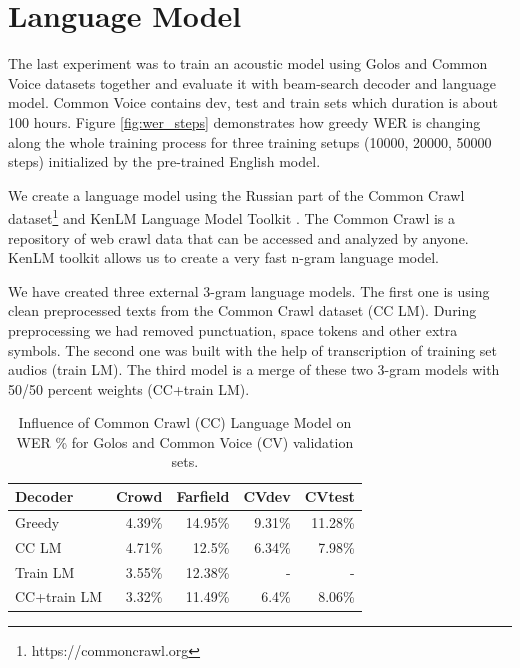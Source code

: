 \documentclass[a4paper]{article}
\begin{document}
\section{Language Model}

The last experiment was to train an acoustic model using Golos and Common Voice \cite{ardila2019common} datasets together and evaluate it with beam-search decoder and language model. Common Voice contains dev, test and train sets which duration is about 100 hours. Figure \ref{fig:wer_steps} demonstrates how greedy WER is changing along the whole training process for three training setups (10000, 20000, 50000 steps) initialized by the pre-trained English model.

We create a language model using the Russian part of the Common Crawl dataset\footnote{https://commoncrawl.org} and KenLM Language Model Toolkit \cite{heafield-2011-kenlm}. The Common Crawl is a repository of web crawl data that can be accessed and analyzed by anyone. KenLM toolkit allows us to create a very fast n-gram language model.

We have created three external 3-gram language models. The first one is using clean preprocessed texts from the Common Crawl dataset (CC LM). During preprocessing we had removed punctuation, space tokens and other extra symbols. The second one was built with the help of transcription of training set audios (train LM). The third model is a merge of these two 3-gram models with 50/50 percent weights (CC+train LM).


\begin{table}[t]
  \caption{Influence of Common Crawl (CC) Language Model on WER \% for Golos and Common Voice (CV) validation sets.}
  \label{tab:language_model}
  \centering
  \begin{tabular}{lrrrr}
    \toprule
    \textbf{Decoder} & \textbf{Crowd} & \textbf{Farfield} & CVdev & CVtest \\
    
    \midrule
    Greedy & 4.39\% & 14.95\% & 9.31\% & 11.28\% \\
    CC LM & 4.71\% & 12.5\% & 6.34\% & 7.98\% \\
    Train LM & 3.55\% & 12.38\% & - & - \\
    CC+train LM & 3.32\% & 11.49\% & 6.4\% & 8.06\%\\
    \bottomrule
  \end{tabular}
\end{table}
\end{document}
